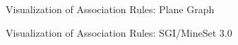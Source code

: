 \begin{frame}{Visualization of Association Rules: Plane Graph}
	\centering
\end{frame}

\begin{frame}{Visualization of Association Rules: SGI/MineSet 3.0}
	\centering
\end{frame}
